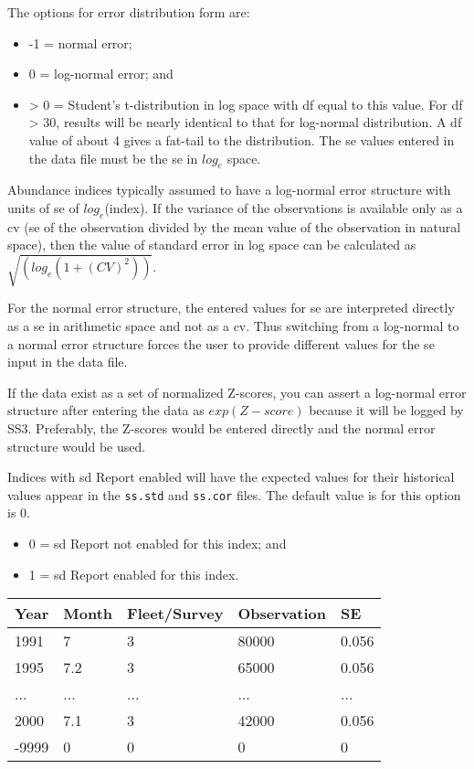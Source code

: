 The options for error distribution form are:
	\begin{itemize}
		\item -1 = normal error;
		\item  0 = log-normal error; and 
		\item > 0 = Student's t-distribution in log space with \gls{df} equal to this value. For \gls{df} > 30, results will be nearly identical to that for log-normal distribution. A \gls{df} value of about 4 gives a fat-tail to the distribution. The \gls{se} values entered in the data file must be the \gls{se} in $log_{e}$ space.
	\end{itemize}

Abundance indices typically assumed to have a log-normal error structure with units of \gls{se} of $log_{e}$(index). If the variance of the observations is available only as a \gls{cv} (\gls{se} of the observation divided by the mean value of the observation in natural space), then the value of standard error in log space can be calculated as $\sqrt{(log_e(1+(CV)^2))}$.

For the normal error structure, the entered values for \gls{se} are interpreted directly as a \gls{se} in arithmetic space and not as a \gls{cv}. Thus switching from a log-normal to a normal error structure forces the user to provide different values for the \gls{se} input in the data file.

If the data exist as a set of normalized Z-scores, you can assert a log-normal error structure after entering the data as $exp(Z-score)$ because it will be logged by SS3. Preferably, the Z-scores would be entered directly and the normal error structure would be used.

Indices with \gls{sd} Report enabled will have the expected values for their historical values appear in the \texttt{ss.std} and \texttt{ss.cor} files. The default value is for this option is 0.
	\begin{itemize}
		\item 0 = \gls{sd} Report not enabled for this index; and
		\item 1 = \gls{sd} Report enabled for this index.
	\end{itemize}


\begin{center}
	\begin{tabular}{p{3cm} p{2cm} p{3cm} p{3cm} p{2.5cm}}
		\hline
		Year & Month & Fleet/Survey & Observation & SE \Tstrut\Bstrut\\
		\hline
		1991 & 7   & 3   & 80000 & 0.056 \Tstrut\\
		1995 & 7.2 & 3   & 65000 & 0.056 \\
		...  & ... & ... & ...   & ... \\
		2000 & 7.1 & 3   & 42000 & 0.056 \\
		-9999 & 0  & 0   & 0     & 0 \Bstrut\\ 
		\hline
	\end{tabular}
	\leavevmode\tagmcend\tagstructend\par
\end{center}


